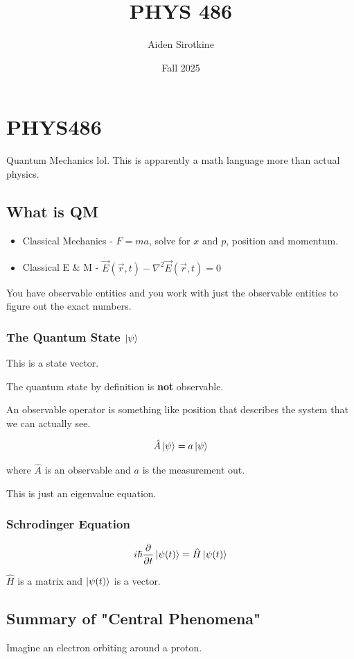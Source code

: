 \documentclass[fleqn]{report}
\date{Fall 2025}
\title{PHYS 486}
\author{Aiden Sirotkine}
\newcommand{\del}{\partial}
\newcommand{\equations} [1] {
\begin{gather*}
#1
\end{gather*}
}
\begin{document}
\setlength{\headsep}{10pt}
\setlength{\topmargin}{-2cm}

\pagestyle{fancy}
\maketitle
\tableofcontents
\clearpage

\chapter{PHYS486}
Quantum Mechanics lol. This is apparently a math language more 
than actual physics.

\section{What is QM}
\begin{itemize}
    \item 
Classical Mechanics - $F = ma$, solve for $x$ and $p$, position and momentum.
    \item
Classical E \& M - $\ddot \vec E(\vec r, t) - \nabla^2 \vec E(\vec r , t) = 0$
\end{itemize}

You have observable entities and you work with just the observable entities to 
figure out the exact numbers. 

\subsection{The Quantum State $\ket \psi$ }
This is a state vector.

The quantum state by definition is \textbf{not} observable.

An observable operator is something like position that describes the system that 
we can actually see. 

\equations{
    \hat A \ket{\psi} 
    =
    a \ket \psi 
}
where $\hat A$ is an observable and $a$ is the measurement out.

This is just an eigenvalue equation.

\subsection{Schrodinger Equation}
\equations{
    i \hbar \frac{\del}{\del t} \ket{\psi(t)} = \hat H \ket{\psi(t)}
}

$\hat H$ is a matrix and $\ket{\psi(t)}$ is a vector.

\section{Summary of "Central Phenomena"}
Imagine an electron orbiting around a proton. 
\end{document}

